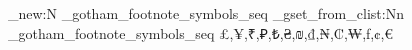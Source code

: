%
%
\ExplSyntaxOn
\seq_new:N \g_gotham_footnote_symbols_seq
\seq_gset_from_clist:Nn \g_gotham_footnote_symbols_seq { £,¥,₹,₽,₺,₴,₪,₫,₦,₡,₩,ƒ,¢,€ }
\newcommand{\setfootnotesymbols}[1]{%
	\seq_gset_from_clist:Nn \g_gotham_footnote_symbols_seq { #1 }
}
\newcommand{\SMFnSymbol}[1]{%
	\seq_item:Nn \g_gotham_footnote_symbols_seq
		{ \int_eval:n { \int_mod:nn { #1 - 1 } { \seq_count:N \g_gotham_footnote_symbols_seq } + 1 } }
}
\ExplSyntaxOff
\renewcommand{\thefootnote}{\SMFnSymbol{\value{footnote}}}
